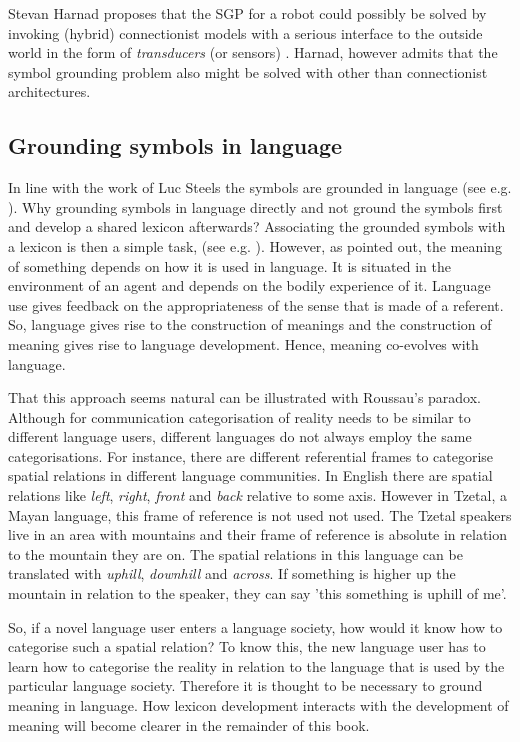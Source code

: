  Stevan Harnad proposes that the SGP for a robot could possibly be solved by invoking (hybrid) connectionist models with a serious interface to the outside world in the form of {\em transducers} (or sensors) \citep{harnad:1993}. Harnad, however admits that the symbol grounding problem also might be solved with other than connectionist architectures.

\subsection{Grounding symbols in language}

In line with the work of Luc Steels the symbols are grounded in language (see e.g. \citealt{steels:1997a,steels:2000}). Why grounding symbols in language directly and not ground the symbols first and develop a shared lexicon afterwards? Associating the grounded symbols with a lexicon is then a simple task, (see e.g. \citealt{oliphant:1997,steels:1996a}). However, as \citet{wittgenstein:1958} pointed out, the meaning of something depends on how it is used in language. It is situated in the environment of an agent and depends on the bodily experience of it. Language use gives feedback on the appropriateness of the sense that is made of a referent. So, language gives rise to the construction of meanings and the construction of meaning gives rise to language development. Hence, meaning co-evolves with language.

That this approach seems natural can be illustrated with Roussau's paradox. Although for communication categorisation of reality needs to be similar to different language users, different languages do not always employ the same categorisations. For instance, there are different referential frames to categorise spatial relations in different language communities. In English there are spatial relations like {\em left}, {\em right}, {\em front} and {\em back} relative to some axis. However in Tzetal, a Mayan language, this frame of reference is not used not used. The Tzetal speakers live in an area with mountains and their frame of reference is absolute in relation to the mountain they are on. The spatial relations in this language can be translated with {\em uphill}, {\em downhill} and {\em across}. If something is higher up the mountain in relation to the speaker, they can say 'this something is uphill of me'.

So, if a novel language user enters a language society, how would it know how to categorise such a spatial relation? To know this, the new language user has to learn how to categorise the reality in relation to the language that is used by the particular language society. Therefore it is thought to be necessary to ground meaning in language. How lexicon development interacts with the development of meaning will become clearer in the remainder of this book.


